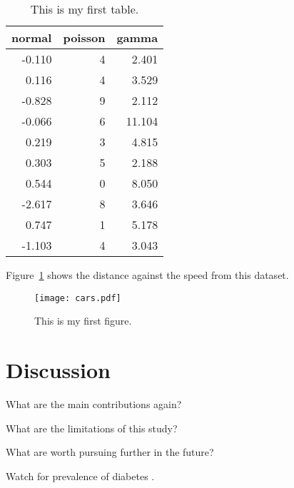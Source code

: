 \documentclass[12pt]{article}
\begin{document}
\begin{table}[tbp]
  \caption{This is my first table.}
  \label{tab:rv}
\centering
\begin{tabular}{rrr}
  \toprule
normal & poisson & gamma \\ 
  \midrule
-0.110 & 4 & 2.401 \\ 
  0.116 & 4 & 3.529 \\ 
  -0.828 & 9 & 2.112 \\ 
  -0.066 & 6 & 11.104 \\ 
  0.219 & 3 & 4.815 \\ 
  0.303 & 5 & 2.188 \\ 
  0.544 & 0 & 8.050 \\ 
  -2.617 & 8 & 3.646 \\ 
  0.747 & 1 & 5.178 \\ 
  -1.103 & 4 & 3.043 \\ 
   \bottomrule
\end{tabular}
\end{table}

Figure~\ref{fig:cars} shows the distance against the speed from this dataset.


\begin{figure}[tbp]
  \centering
  \texttt{[image: cars.pdf]}
  \caption{This is my first figure.}
  \label{fig:cars}
\end{figure}

\section{Discussion}
\label{sec:disc}

What are the main contributions again?

What are the limitations of this study?

What are worth pursuing further in the future?

\lipsum[1-2]
Watch for prevalence of diabetes \citep{wild2004global}.



\end{document}
